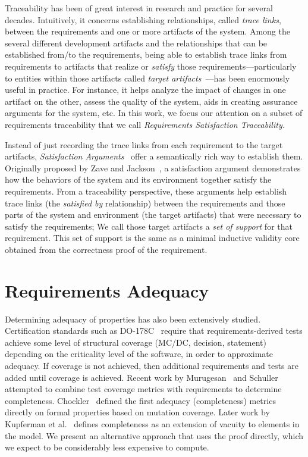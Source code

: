Traceability has been of great interest in research and practice for several decades. Intuitively, it concerns establishing relationships, called \emph{trace links}, between the requirements and one or more artifacts of the system.
Among the several different development artifacts and the relationships that can be established from/to the requirements, being able to establish trace links from requirements to artifacts that realize or \emph{satisfy} those requirements---particularly
to entities within those artifacts called \emph{target artifacts}~\cite{gotel2012traceability}---has been enormously useful in practice. For instance, it helps analyze the impact of changes in one artifact on the other, assess the quality of the system, aids in creating assurance arguments for the system, etc. In this work, we focus our attention on a subset of requirements traceability that we call \emph{Requirements Satisfaction Traceability.}

Instead of just recording the trace links from each requirement to the target artifacts, \emph{Satisfaction Arguments}~\cite{zave1997four} offer a semantically rich way to establish them. Originally proposed by Zave and Jackson~\cite{zave1997four}, a satisfaction argument demonstrates how the behaviors of the system and its environment together satisfy the requirements. From a traceability perspective, these arguments help establish
 trace links (the \emph{satisfied by} relationship) between the requirements and those parts of the system and environment (the target artifacts) that were necessary to satisfy the requirements; We call those target artifacts a \emph{set of support} for that requirement. This set of support is the same as a minimal inductive validity core obtained from the correctness proof of the requirement.

\section{Requirements Adequacy}
Determining adequacy of properties has also been extensively studied. Certification standards such as DO-178C~\cite{DO178C} require that requirements-derived tests achieve some level of structural coverage (MC/DC, decision, statement) depending on the criticality level of the software, in order to approximate adequacy.  If coverage is not achieved, then additional requirements and tests are added until coverage is achieved. Recent work by Murugesan~\cite{murugesan2015we} and Schuller~\cite{schuler_assessing_2011} attempted to combine test coverage metrics with requirements to determine completeness.  Chockler~\cite{chockler_coverage_2003} defined the first adequacy (completeness) metrics directly on formal properties based on mutation coverage.  Later work by Kupferman et al.~\cite{Kupferman:2006:SCF} defines completeness as an extension of vacuity to elements in the model.  We present an alternative approach that uses the proof directly, which we expect to be considerably less expensive to compute.


